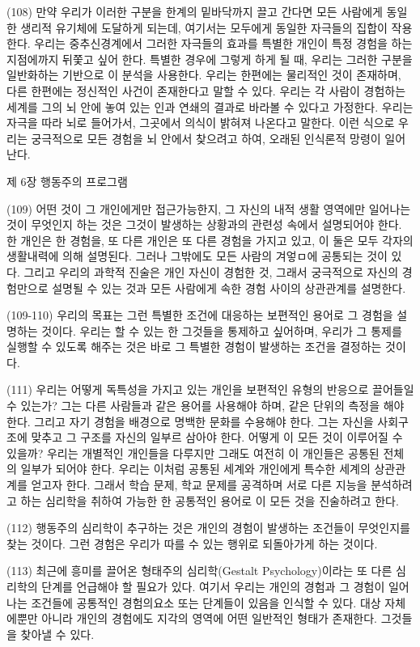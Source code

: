 \documentclass[11pt, a4paper]{article}
\begin{document}
(108) 만약 우리가 이러한 구분을 한계의 밑바닥까지 끌고 간다면 모든 사람에게 동일한 생리적 유기체에 도달하게 되는데, 여기서는 모두에게 동일한 자극들의 집합이 작용한다. 우리는 중추신경계에서 그러한 자극들의 효과를 특별한 개인이 특정 경험을 하는 지점에까지 뒤쫓고 싶어 한다. 특별한 경우에 그렇게 하게 될 때, 우리는 그러한 구분을 일반화하는 기반으로 이 분석을 사용한다. 우리는 한편에는 물리적인 것이 존재하며, 다른 한편에는 정신적인 사건이 존재한다고 말할 수 있다. 우리는 각 사람이 경험하는 세계를 그의 뇌 안에 놓여 있는 인과 연쇄의 결과로 바라볼 수 있다고 가정한다. 우리는 자극을 따라 뇌로 들어가서, 그곳에서 의식이 밝혀져 나온다고 말한다. 이런 식으로 우리는 궁극적으로 모든 경험을 뇌 안에서 찾으려고 하여, 오래된 인식론적 망령이 일어난다.

제 6장 행동주의 프로그램

(109) 어떤 것이 그 개인에게만 접근가능한지, 그 자신의 내적 생활 영역에만 일어나는 것이 무엇인지 하는 것은 그것이 발생하는 상황과의 관련성 속에서 설명되어야 한다. 한 개인은 한 경험을, 또 다른 개인은 또 다른 경험을 가지고 있고, 이 둘은 모두 각자의 생활내력에 의해 설명된다. 그러나 그밖에도 모든 사람의 겨엏ㅁ에 공통되는 것이 있다. 그리고 우리의 과학적 진술은 개인 자신이 경험한 것, 그래서 궁극적으로 자신의 경험만으로 설명될 수 있는 것과 모든 사람에게 속한 경험 사이의 상관관계를 설명한다.

(109-110) 우리의 목표는 그런 특별한 조건에 대응하는 보편적인 용어로 그 경험을 설명하는 것이다. 우리는 할 수 있는 한 그것들을 통제하고 싶어하며, 우리가 그 통제를 실행할 수 있도록 해주는 것은 바로 그 특별한 경험이 발생하는 조건을 결정하는 것이다.

(111) 우리는 어떻게 독특성을 가지고 있는 개인을 보편적인 유형의 반응으로 끌어들일 수 있는가? 그는 다른 사람들과 같은 용어를 사용해야 하며, 같은 단위의 측정을 해야 한다. 그리고 자기 경험을 배경으로 명백한 문화를 수용해야 한다. 그는 자신을 사회구조에 맞추고 그 구조를 자신의 일부르 삼아야 한다. 어떻게 이 모든 것이 이루어질 수 있을까? 우리는 개별적인 개인들을 다루지만 그래도 여전히 이 개인들은 공통된 전체의 일부가 되어야 한다. 우리는 이처럼 공통된 세계와 개인에게 특수한 세계의 상관관계를 얻고자 한다. 그래서 학습 문제, 학교 문제를 공격하며 서로 다른 지능을 분석하려고 하는 심리학을 취하여 가능한 한 공통적인 용어로 이 모든 것을 진술하려고 한다.

(112) 행동주의 심리학이 추구하는 것은 개인의 경험이 발생하는 조건들이 무엇인지를 찾는 것이다. 그런 경험은 우리가 따를 수 있는 행위로 되돌아가게 하는 것이다.

(113) 최근에 흥미를 끌어온 형태주의 심리학(Gestalt Psychology)이라는 또 다른 심리학의 단계를 언급해야 할 필요가 있다. 여기서 우리는 개인의 경험과 그 경험이 일어나는 조건들에 공통적인 경험의요소 또는 단계들이 있음을 인식할 수 있다. 대상 자체에뿐만 아니라 개인의 경험에도 지각의 영역에 어떤 일반적인 형태가 존재한다. 그것들을 찾아낼 수 있다. 
\end{document}
